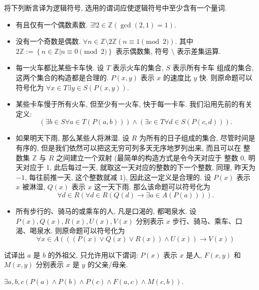 \documentclass[10pt,UTF8]{ctexbook} %
\begin{document}
\begin{exercise}
    将下列断言译为逻辑符号, 选用的谓词应使逻辑符号中至少含有一个量词.
    \begin{itemize}[itemsep=0pt]
        \item {\kaishu 有且仅有一个偶数素数}. $\exists! 2 \in \mathbb{Z} \left(\gcd(2,1)=1\right)$.
        \item {\kaishu 没有一个奇数是偶数}. $\forall n \in \mathbb{Z} \setminus 2\mathbb{Z} \left( n \equiv 1 \pmod 2 \right)$.
        其中 $2\mathbb{Z} := \left\{ n \in \mathbb{Z} | n \equiv 0 \pmod 2 \right\}$ 表示偶数集,
        符号 $\setminus$ 表示差集运算.
        \item {\kaishu 每一火车都比某些卡车快}. 设 $T$ 表示火车的集合, $S$ 表示所有卡车
        组成的集合, 这两个集合的构造都是合理的. $P(x,y)$ 表示 $x$ 的速度比 $y$ 快.
        则原命题可以符号化为 $\forall x \in T \exists y \in S \left( P(x,y) \right)$.
        \item {\kaishu 某些卡车慢于所有火车, 但至少有一火车, 快于每一卡车}.
        我们沿用先前的有关定义:
        \[ \left(\exists b \in S \forall a \in T (P(a,b))\right)
        \wedge \left(
            \exists c \in T \forall d \in S \left( P(c,d) \right)
        \right). \]
        \item {如果明天下雨, 那么某些人将淋湿}. 设 $R$ 为所有的日子组成的集合,
        尽管时间是有序的, 但是我们依然可以把这无穷可列多天无序地罗列出来, 而且可以在
        整数集 $\mathbb{Z}$ 与 $R$ 之间建立一个双射 (最简单的构造方式是令今天对应于
        整数 0, 明天对应于 1, 此后每过一天, 就取这一天对应的整数的下一个整数, 同理,
        昨天为 $-1$, 每往前推一天, 这个整数就减 1), 因此这一定义是合理的.
        设 $P(x)$ 表示 $x$ 被淋湿, $Q(x)$ 表示 $x$ 这一天下雨. 那么该命题可以符号化为
        \[ \forall d \in R \left(
            \forall d \in R \left( Q(d) \to 
            \exists a \in A \left( P(a) \right) \right)
        \right). \]
        \item {所有步行的、骑马的或乘车的人, 凡是口渴的, 都喝泉水}. 设
        $P(x), Q(x), R(x), U(x), V(x)$ 分别表示 $x$ 步行、骑马、乘车、口渴、喝泉水.
        则原命题可以符号化为 
        \[ \forall x \in A \left(
            \left(\left(
                P(x) \vee Q(x) \vee R(x)
            \right) \wedge U(x)\right)
            \to V(x)
        \right) \]
    \end{itemize}
\end{exercise}

\begin{exercise}
    试译出 {\kaishu $a$ 是 $b$ 的外祖父}, 只允许用以下谓词: $P(x)$ 表示 $x$ 是人,
    $F(x,y)$ 和 $M(x,y)$ 分别表示 $x$ 是 $y$ 的父亲/母亲.
    \begin{sol}
        $\exists a,b,c \left(P(a) \wedge P(b) \wedge P(c) \wedge F(a,c) \wedge M(c,b)\right)$.
    \end{sol}
\end{exercise}
\end{document}
